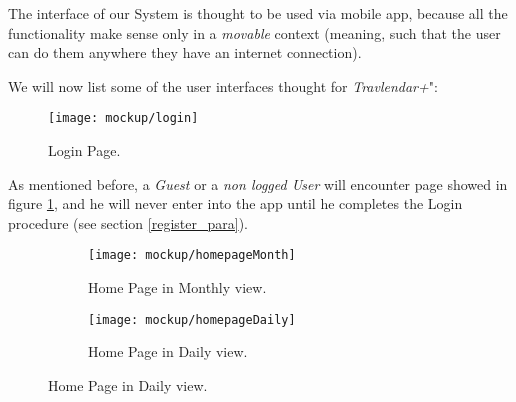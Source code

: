 The interface of our System is thought to be used via mobile app, because all the functionality make sense only in a \textit{movable} context (meaning, such that the user can do them anywhere they have an internet connection).

We will now list some of the user interfaces thought for \textit{Travlendar+}":

\begin{figure}[h]
	\texttt{[image: mockup/login]}
	\centering
	\caption{Login Page.}
	\label{fig:login}
\end{figure}
As mentioned before, a \textit{Guest} or a \textit{non logged User} will encounter page showed in figure \ref{fig:login}, and he will never enter into the app until he completes the Login procedure (see section \ref{register_para}).

\begin{figure}[H]
	\begin{subfigure}{0.5\textwidth}
		\texttt{[image: mockup/homepageMonth]} 
		\centering
		\caption{Home Page in Monthly view.}
		\label{fig:homePage_Month}
	\end{subfigure}
	\begin{subfigure}{0.5\textwidth}
		\texttt{[image: mockup/homepageDaily]} 
		\centering
		\caption{Home Page in Daily view.}
		\label{fig:homePage_Day}
	\end{subfigure}
\end{figure}

\vfill
